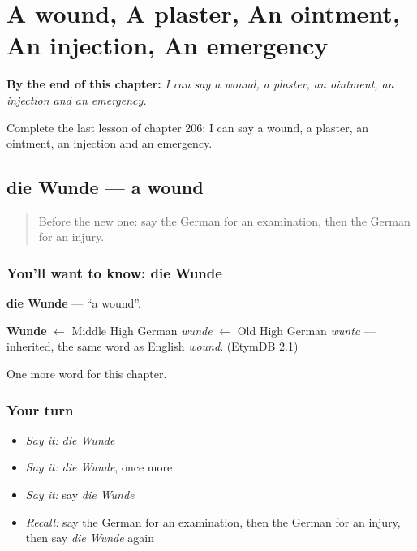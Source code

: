 
\chapter{A wound, A plaster, An ointment, An injection, An emergency}
\label{ch:ge-a-wound-a-plaster-an-ointment-an-injection-an-emergency}

\begin{chapteropening}
\textbf{By the end of this chapter:} \emph{I can say a wound, a plaster, an ointment, an injection and an emergency.}

Complete the last lesson of chapter 206: I can say a wound, a plaster, an ointment, an injection and an emergency.
\end{chapteropening}

\section[die Wunde]{die Wunde — a wound}

\label{lesson:GE-C206-wunde}



\begin{quote}
Before the new one: say the German for an examination, then the German for an injury.
\end{quote}

\subsection*{You'll want to know: die Wunde}
\textbf{die Wunde} — \textquotedblleft{}a wound\textquotedblright{}.

\begin{cousinweb}
\textbf{Wunde} $\leftarrow$ Middle High German \emph{wunde} $\leftarrow$ Old High German \emph{wunta} — inherited, the same word as English \emph{wound}. (EtymDB 2.1)
\end{cousinweb}

\begin{grammarlens}[title={What you've built}]
One more word for this chapter.
\end{grammarlens}

\subsection*{Your turn}
\begin{itemize}
\raggedright
  \item \emph{Say it:} \emph{die Wunde}
  \item \emph{Say it:} \emph{die Wunde}, once more
  \item \emph{Say it:} say \emph{die Wunde}
  \item \emph{Recall:} say the German for an examination, then the German for an injury, then say \emph{die Wunde} again
\end{itemize}

